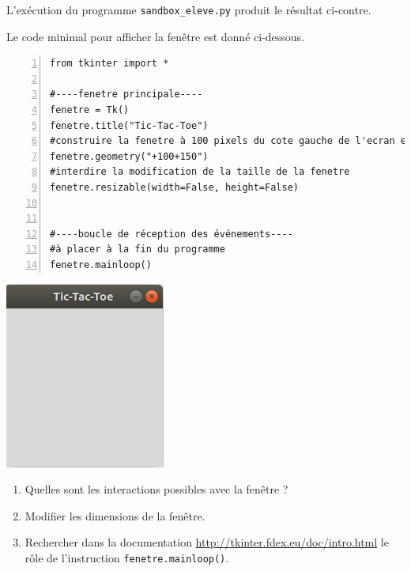 \documentclass[a4paper, french, 12pt]{article}  %
\newcounter{exo}
\newcounter{exoB}
\newenvironment{exerciceB2}
{\par \bigskip  \noindent \addtocounter{exoB}{1} \hrulefill \quad { \large \textbf{Exercice \theexoB}} \quad \hrulefill \par \medskip }
{\par \bigskip }
\newcounter{act}
\begin{document}
\begin{exerciceB2}{}
\begin{minipage}{0.75\linewidth}
L'exécution du programme \verb+sandbox_eleve.py+ produit le résultat ci-contre.

Le code minimal pour afficher  la fenêtre est donné ci-dessous. 

\begin{lstlisting}[numbers=left]
from tkinter import *

#----fenetre principale----
fenetre = Tk()
fenetre.title("Tic-Tac-Toe")
#construire la fenetre à 100 pixels du cote gauche de l'ecran et 150 pixels du cote haut
fenetre.geometry("+100+150")
#interdire la modification de la taille de la fenetre
fenetre.resizable(width=False, height=False)


#----boucle de réception des événements----
#à placer à la fin du programme 
fenetre.mainloop()
\end{lstlisting}
 
\end{minipage}\hfill
\begin{minipage}{0.25\linewidth}
\begin{center}
	\includegraphics[scale=0.5]{graphiques/tictactoe.png}
\end{center}
\end{minipage}

\begin{enumerate}
	\item Quelles sont les interactions possibles avec la fenêtre ?
	\item Modifier les dimensions de la fenêtre.
	\item Rechercher dans la documentation \url{http://tkinter.fdex.eu/doc/intro.html} le rôle de l'instruction \texttt{fenetre.mainloop()}.
\end{enumerate}
\end{exerciceB2}
\end{document}
